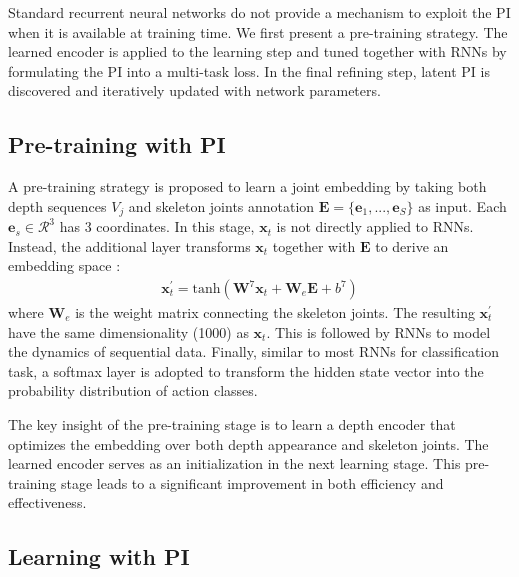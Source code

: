 \documentclass[10pt,twocolumn,letterpaper]{article}
\begin{document}
Standard recurrent neural networks do not provide a mechanism to exploit the PI when it is available at training time. We first present a pre-training strategy. The learned encoder is applied to the learning step and  tuned together with RNNs by formulating the PI into a multi-task loss. In the final refining step, latent PI is discovered and iteratively updated with network parameters.


\subsection{Pre-training with PI}
\label{sec:pretrain}

A pre-training strategy is proposed to learn a joint embedding by taking both depth sequences $V_j$ and skeleton joints annotation $\bm{E}=\{ \bm{e}_1,...,\bm{e}_S \}$ as input. Each $\bm{e}_s \in \mathcal{R}^3$ has 3 coordinates. In this stage, $\bm{x}_t$ is not directly applied to RNNs. Instead, the additional layer transforms $\bm{x}_t$ together with $\bm{E}$ to derive an embedding space :
\begin{align}
\bm{x}^{\prime}_t=\mathrm{tanh}(\bm{W}^7\bm{x}_t+\bm{W}_{e}\bm{E}+b^7)
\label{eq:pretrain}
\end{align}
where $\bm{W}_{e}$ is the weight matrix connecting the skeleton joints. The resulting $\bm{x}^{\prime}_t$ have the same dimensionality (1000) as $\bm{x}_t$. This is followed by RNNs to model the dynamics of sequential data. Finally, similar to most RNNs for classification task, a softmax layer is adopted to transform the hidden state vector into the probability distribution of action classes.

The key insight of the pre-training stage is to learn a depth encoder that optimizes the embedding over both depth appearance and skeleton joints. The learned encoder serves as an initialization in the next learning stage. This pre-training stage leads to a significant improvement in both efficiency and effectiveness.


\subsection{Learning with PI}
\label{sec:learning}
\end{document}

